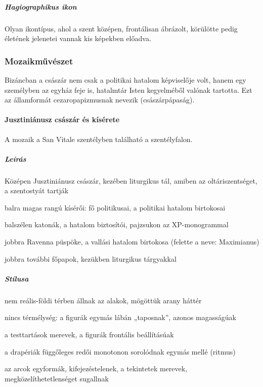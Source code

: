 	\subparagraph{Hagiographikus ikon}
	Olyan ikontípus, ahol a szent középen, frontálisan ábrázolt, körülötte pedig
	életének jelenetei vannak kis képekben előadva.

\clearpage
	
\subsubsection{Mozaikművészet}

	Bizáncban a császár nem csak a politikai hatalom képviselője volt, hanem egy személyben az egyház feje is, hatalmtár Isten kegyelméből valónak tartotta. Ezt az államformát cezaropapizmusnak nevezik (császárpápaság).
	
	\paragraph{Jusztiniánusz császár és kísérete}
	A mozaik a San Vitale szentélyben található a szentélyfalon.
	
	
	\subparagraph{Leírás}
	\begin{compactitem}
		\item Középen Jusztiniánusz császár, kezében liturgikus tál, amiben az oltáriszentséget, a szentostyát tartják
		\item balra magas rangú kísérői: fő politikusai, a politikai hatalom birtokosai
		\item balszélen katonák, a hatalom biztosítói, pajzsukon az XP-monogrammal
		\item jobbra Ravenna püspöke, a vallási hatalom birtokosa (felette a neve: Maximianus)
		\item jobbra további főpapok, kezükben liturgikus tárgyakkal
	\end{compactitem}

	\subparagraph{Stílusa}
	\begin{compactitem}
		\item nem reális-földi térben állnak az alakok, mögöttük arany háttér
		\item nincs térmélység: a figurák egymás lábán „taposnak”, azonos magasságúak
		\item a testtartások merevek, a figurák frontális beállításúak
		\item a drapériák függőleges redői monotonon sorolódnak egymás mellé (ritmus)
		\item az arcok egyformák, kifejezéstelenek, a tekintetek merevek, megközelíthetetlenséget sugallnak
	\end{compactitem}

